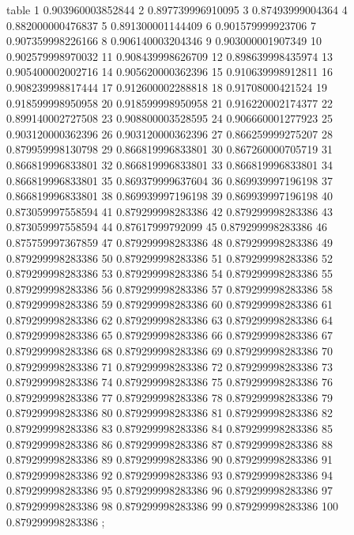 table {%
	1 0.903960003852844
	2 0.897739996910095
	3 0.87493999004364
	4 0.882000000476837
	5 0.891300001144409
	6 0.901579999923706
	7 0.907359998226166
	8 0.906140003204346
	9 0.903000001907349
	10 0.902579998970032
	11 0.908439998626709
	12 0.898639998435974
	13 0.905400002002716
	14 0.905620000362396
	15 0.910639998912811
	16 0.908239998817444
	17 0.912600002288818
	18 0.91708000421524
	19 0.918599998950958
	20 0.918599998950958
	21 0.916220002174377
	22 0.899140002727508
	23 0.908800003528595
	24 0.906660001277923
	25 0.903120000362396
	26 0.903120000362396
	27 0.866259999275207
	28 0.879959998130798
	29 0.866819996833801
	30 0.867260000705719
	31 0.866819996833801
	32 0.866819996833801
	33 0.866819996833801
	34 0.866819996833801
	35 0.869379999637604
	36 0.869939997196198
	37 0.866819996833801
	38 0.869939997196198
	39 0.869939997196198
	40 0.873059997558594
	41 0.879299998283386
	42 0.879299998283386
	43 0.873059997558594
	44 0.87617999792099
	45 0.879299998283386
	46 0.875759997367859
	47 0.879299998283386
	48 0.879299998283386
	49 0.879299998283386
	50 0.879299998283386
	51 0.879299998283386
	52 0.879299998283386
	53 0.879299998283386
	54 0.879299998283386
	55 0.879299998283386
	56 0.879299998283386
	57 0.879299998283386
	58 0.879299998283386
	59 0.879299998283386
	60 0.879299998283386
	61 0.879299998283386
	62 0.879299998283386
	63 0.879299998283386
	64 0.879299998283386
	65 0.879299998283386
	66 0.879299998283386
	67 0.879299998283386
	68 0.879299998283386
	69 0.879299998283386
	70 0.879299998283386
	71 0.879299998283386
	72 0.879299998283386
	73 0.879299998283386
	74 0.879299998283386
	75 0.879299998283386
	76 0.879299998283386
	77 0.879299998283386
	78 0.879299998283386
	79 0.879299998283386
	80 0.879299998283386
	81 0.879299998283386
	82 0.879299998283386
	83 0.879299998283386
	84 0.879299998283386
	85 0.879299998283386
	86 0.879299998283386
	87 0.879299998283386
	88 0.879299998283386
	89 0.879299998283386
	90 0.879299998283386
	91 0.879299998283386
	92 0.879299998283386
	93 0.879299998283386
	94 0.879299998283386
	95 0.879299998283386
	96 0.879299998283386
	97 0.879299998283386
	98 0.879299998283386
	99 0.879299998283386
	100 0.879299998283386
};
